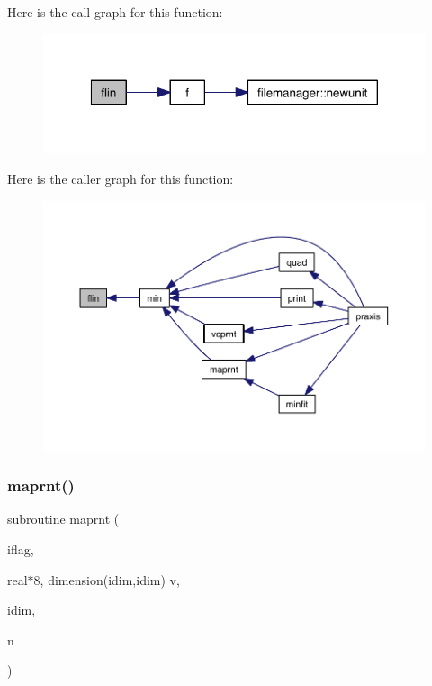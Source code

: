 Here is the call graph for this function\+:\nopagebreak
\begin{figure}[H]
\begin{center}
\leavevmode
\includegraphics[width=320pt]{praxis_8f_a590128548b876bdd2e640b35ccee9515_cgraph}
\end{center}
\end{figure}
Here is the caller graph for this function\+:\nopagebreak
\begin{figure}[H]
\begin{center}
\leavevmode
\includegraphics[width=350pt]{praxis_8f_a590128548b876bdd2e640b35ccee9515_icgraph}
\end{center}
\end{figure}
\mbox{\label{praxis_8f_ac6663bade5f6b02f5bc8c05767d38027}} 
\subsubsection{\texorpdfstring{maprnt()}{maprnt()}}
{\footnotesize\ttfamily subroutine maprnt (\begin{DoxyParamCaption}\item[{}]{iflag,  }\item[{real$\ast$8, dimension(idim,idim)}]{v,  }\item[{}]{idim,  }\item[{}]{n }\end{DoxyParamCaption})}

